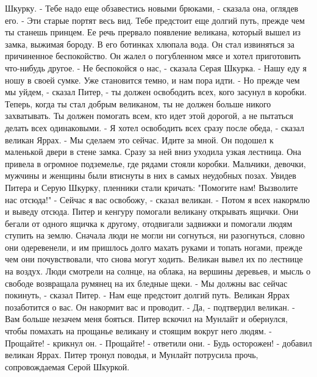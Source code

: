 Шкурку.
    - Тебе надо еще обзавестись новыми брюками, - сказала она, оглядев 
его. - Эти старые портят весь вид. Тебе предстоит еще долгий путь, 
прежде чем ты станешь принцем.
    Ее речь прервало появление великана, который вышел из замка, 
выжимая бороду. В его ботинках хлюпала вода. Он стал извиняться за 
причиненное беспокойство. Он жалел о погубленном мясе и хотел 
приготовить что-нибудь другое.
    - Не беспокойся о нас, - сказала Серая Шкурка. - Нашу еду я ношу в 
своей сумке. Уже становится темно, и нам пора идти.
    - Но прежде чем мы уйдем, - сказал Питер, - ты должен освободить 
всех, кого засунул в коробки. Теперь, когда ты стал добрым великаном, 
ты не должен больше никого захватывать. Ты должен помогать всем, кто 
идет этой дорогой, а не пытаться делать всех одинаковыми.
    - Я хотел освободить всех сразу после обеда, - сказал великан 
Яррах. - Мы сделаем это сейчас. Идите за мной.
    Он подошел к маленькой двери в стене замка. Сразу за ней вниз 
уходила узкая лестница. Она привела в огромное подземелье, где рядами 
стояли коробки. Мальчики, девочки, мужчины и женщины были втиснуты в 
них в самых неудобных позах. Увидев Питера и Серую Шкурку, пленники 
стали кричать: "Помогите нам! Вызволите нас отсюда!"
    - Сейчас я вас освобожу, - сказал великан. - Потом я всех накормлю 
и выведу отсюда.
    Питер и кенгуру помогали великану открывать ящички. Они бегали от 
одного ящичка к другому, отодвигали задвижки и помогали людям ступить 
на землю. Сначала люди не могли ни согнуться, ни разогнуться, словно 
они одеревенели, и им пришлось долго махать руками и топать ногами, 
прежде чем они почувствовали, что снова могут ходить. Великан вывел их 
по лестнице на воздух. Люди смотрели на солнце, на облака, на вершины 
деревьев, и мысль о свободе возвращала румянец на их бледные щеки.
    - Мы должны вас сейчас покинуть, - сказал Питер. - Нам еще 
предстоит долгий путь. Великан Яррах позаботится о вас. Он накормит 
вас и проводит.
    - Да, - подтвердил великан. - Вам больше незачем меня бояться.
    Питер вскочил на Мунлайт и обернулся, чтобы помахать на прощанье 
великану и стоящим вокруг него людям.
    - Прощайте! - крикнул он.
    - Прощайте! - ответили они.
    - Будь осторожен! - добавил великан Яррах. Питер тронул поводья, и 
Мунлайт потрусила прочь, сопровождаемая Серой Шкуркой.
